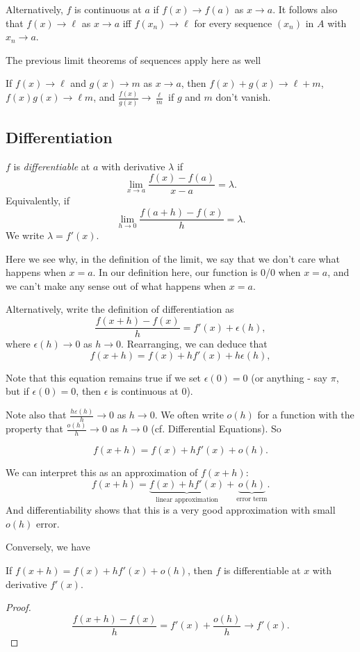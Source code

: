 \documentclass[a4paper]{article}
\begin{document}
Alternatively, $f$ is continuous at $a$ if $f(x) \to f(a)$ as $x \to a$. It follows also that $f(x) \to \ell$ as $x\to a$ iff $f(x_n) \to \ell$ for every sequence $(x_n)$ in $A$ with $x_n\to a$.

The previous limit theorems of sequences apply here as well
\begin{prop}
  If $f(x)\to \ell$ and $g(x)\to m$ as $x\to a$, then $f(x) + g(x) \to \ell+ m$, $f(x)g(x) \to \ell m$, and $\frac{f(x)}{g(x)}\to \frac{\ell}{m}$ if $g$ and $m$ don't vanish.
\end{prop}

\subsection{Differentiation}
\begin{defi}
  $f$ is \emph{differentiable} at $a$ with derivative $\lambda$ if
  \[
    \lim_{x\to a}\frac{f(x) - f(a)}{x - a} = \lambda.
  \]
  Equivalently, if
  \[
    \lim_{h\to 0}\frac{f(a + h) - f(x)}{h} = \lambda.
  \]
  We write $\lambda = f'(x)$.
\end{defi}
Here we see why, in the definition of the limit, we say that we don't care what happens when $x = a$. In our definition here, our function is 0/0 when $x = a$, and we can't make any sense out of what happens when $x = a$.

Alternatively, write the definition of differentiation as
\[
  \frac{f(x + h) - f(x)}{h} = f'(x) + \epsilon(h),
\]
where $\epsilon(h) \to 0$ as $h \to 0$. Rearranging, we can deduce that
\[
  f(x + h) = f(x) + hf'(x) + h\epsilon(h),
\]

Note that this equation remains true if we set $\epsilon(0) = 0$ (or anything - say $\pi$, but if $\epsilon(0) = 0$, then $\epsilon$ is continuous at $0$).

Note also that $\frac{h\varepsilon(h)}{h}\to 0$ as $h\to 0$. We often write $o(h)$ for a function with the property that $\frac{o(h)}{h}\to 0$ as $h\to 0$ (cf. Differential Equations). So
\begin{prop}
  \[
    f(x + h) = f(x) + hf'(x) + o(h).
  \]
\end{prop}
We can interpret this as an approximation of $f(x + h)$:
\[
  f(x + h) = \underbrace{f(x) + hf'(x)}_{\text{linear approximation}} + \underbrace{o(h)}_{\text{error term}}.
\]
And differentiability shows that this is a very good approximation with small $o(h)$ error.

Conversely, we have
\begin{prop}
  If $f(x + h) = f(x) + hf'(x) + o(h)$, then $f$ is differentiable at $x$ with derivative $f'(x)$.
\end{prop}
\begin{proof}
  \[
    \frac{f(x + h) - f(x)}{h} = f'(x) + \frac{o(h)}{h} \to f'(x).
  \]
\end{proof}
\end{document}

